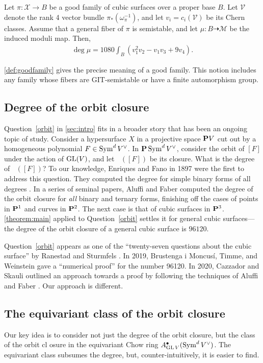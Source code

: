 \documentclass[12pt,reqno]{amsart}
\DeclareMathOperator{\Orb}{\overline{Orb}}
\renewcommand{\to}{{\longrightarrow}}
\numberwithin{equation}{section}
\newcommand{\V}{\mathcal V}
\newcommand{\cX}{\mathcal{X}}
\begin{document}
\begin{theorem}\label{theorem:main}
  Let $\pi \colon \cX \to B$ be a good family of cubic surfaces over a
  proper base $B$.
  Let $\V$ denote the rank 4 vector bundle
  $ \pi_* \left(\omega_\pi^{-1}\right)$, and let
  \(v_i = c_i\left(\V\right)\) be its Chern classes.  Assume that a
  general fiber of $\pi$ is semistable, and let
  $\mu \colon B \dashrightarrow \mathcal M$ be the induced moduli map.  Then,
  \begin{align}
    \deg \mu =
    \label{eq:MAIN}
    1080 \int_{B} \left(v_{1}^{2}v_{2} - v_{1}v_{3}+ 9v_{4}\right).
  \end{align}
\end{theorem}
\autoref{def:goodfamily} gives the precise meaning of a good family.  This notion includes any family whose fibers are
GIT-semistable or have a finite automorphism group.

\subsection{Degree of the orbit closure}
Question~\ref{orbit} in \autoref{sec:intro} fits in a broader story
that has been an ongoing topic of study.  Consider a hypersurface
\(X\) in a projective space $\P V$ cut out by a homogeneous polynomial
$F \in \Sym^d V^\vee$.  In $\P\Sym^dV^\vee$, consider the orbit of
$[F]$ under the action of $\GL(V)$, and let $\Orb([F])$ be its
closure.
What is the degree of $\Orb([F])$?
To our knowledge, Enriques
and Fano in 1897 were the first to address this question.
They computed the degree for simple
binary forms of all degrees \cite{enr.fan:97}.  In a series of
seminal papers, Aluffi and Faber computed the degree of the orbit
closure for \emph{all} binary and ternary forms, finishing off the cases of points in $\P^1$ and curves in $\P^2$.
The next case is that of cubic surfaces in $\P^3$.
\autoref{theorem:main} applied to Question~\ref{orbit} settles it for general cubic surfaces---the degree of the orbit closure of a general cubic surface is $96120$.

Question~\ref{orbit} appears as one of the ``twenty-seven questions
about the cubic surface'' by Ranestad and Sturmfels \cite{ran.stu:20}.
In 2019, Brustenga i Moncus\'i, Timme, and Weinstein gave a
``numerical proof'' for the number 96120. In 2020, Cazzador and
Skauli outlined an approach towards a proof by following the
techniques of Aluffi and Faber \cite{bru-i-mon.tim.wei:20,caz.ska:20}.
Our approach is different.

\subsection{The equivariant class of the orbit closure}
Our key idea is to consider not just the degree of the orbit closure,
but the class of the orbit cl osure in the equivariant Chow ring
$A^\bullet_{\GL V}(\Sym^dV^\vee)$.
The equivariant class subsumes the
degree, but, counter-intuitively, it is easier to find.
\end{document}
